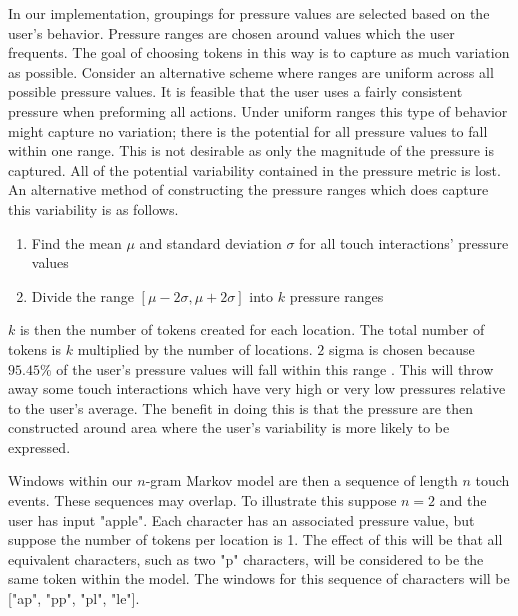 In our implementation,
groupings for pressure values are selected based on the user's behavior.
Pressure ranges are chosen around values which the user frequents.
The goal of choosing tokens in this way is to capture
as much variation as possible.
%
Consider an alternative scheme where ranges are
uniform across all possible pressure values.
It is feasible that the user uses a fairly consistent
pressure when preforming all actions.
Under uniform ranges this type of behavior might 
capture no variation; there is the potential
for all pressure values to fall within one range.
This is not desirable as 
only the magnitude of the pressure is captured.
All of the potential variability contained
in the pressure metric is lost.
%
An alternative method of constructing
the pressure ranges which does capture 
this variability is as follows.
\begin{enumerate}
\item Find the mean $\mu$ and standard deviation $\sigma$ 
  for all touch interactions' pressure values
\item Divide the range $[\mu-2\sigma, \mu+2\sigma]$ into $k$ pressure ranges
\end{enumerate}
%
$k$ is then the number of tokens created for each location.
The total number of tokens is $k$ multiplied by the number of locations.
$2$ sigma is chosen because $95.45\%$ of the user's pressure values
will fall within this range
\cite{threesigmarule}.
This will throw away some touch interactions
which have very high or very low pressures
relative to the user's average.
The benefit in doing this is
that the pressure are then constructed around
area where the user's variability is more likely to be expressed. %

Windows within our $n$-gram Markov model are then
a sequence of length $n$ touch events.
%
These sequences may overlap.
To illustrate this suppose $n = 2$ and the user has input "apple".
Each character has an associated pressure value,
but suppose the number of tokens per location is 1.
The effect of this will be that all equivalent characters,
such as two "p" characters, 
will be considered to be the same token within the model.
The windows for this sequence of characters will be
["ap", "pp", "pl", "le"].
%

